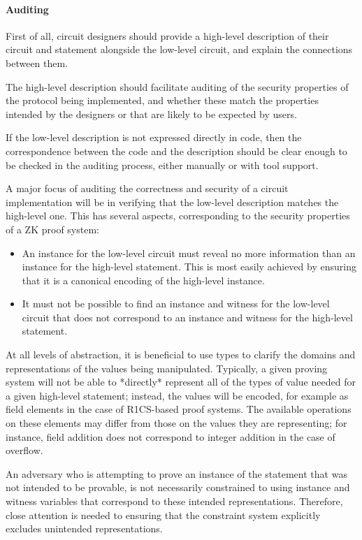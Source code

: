 \paragraph{Auditing}
First of all, circuit designers should provide a high-level description of their circuit and statement alongside the low-level circuit, and explain the connections between them.             

The high-level description should facilitate auditing of the security properties of the protocol being implemented, and whether these match the properties intended by the designers or that are likely to be expected by users.

If the low-level description is not expressed directly in code, then the correspondence between the code and the description should be clear enough to be checked in the auditing process, either manually or with tool support.

A major focus of auditing the correctness and security of a circuit implementation will be in verifying that the low-level description matches the high-level one.
This has several aspects, corresponding to the security properties of a ZK proof system:
\begin{itemize}
    \item An instance for the low-level circuit must reveal no more information than an instance for the high-level statement.
    This is most easily achieved by ensuring that it is a canonical encoding of the high-level instance.
    \item It must not be possible to find an instance and witness for the low-level circuit that does not correspond to an instance and witness for the high-level statement.
\end{itemize}

At all levels of abstraction, it is beneficial to use types to clarify the domains and representations of the values being manipulated.
Typically, a given proving system will not be able to *directly* represent all of the types of value needed for a given high-level statement;
instead, the values will be encoded, for example as field elements in the case of R1CS-based proof systems.
The available operations on these elements may differ from those on the values they are representing;
for instance, field addition does not correspond to integer addition in the case of overflow.

An adversary who is attempting to prove an instance of the statement that was not intended to be provable, is not necessarily constrained to using instance and witness variables that correspond to these intended representations.
Therefore, close attention is needed to ensuring that the constraint system explicitly excludes unintended representations.

